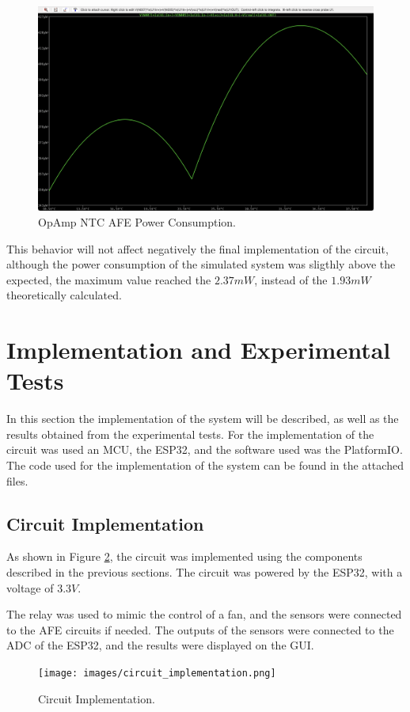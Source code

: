 \documentclass[12pt]{article}
\begin{document}
    \begin{figure}[H] 
        \centering
        \includegraphics*[scale = 0.3]{images/PowerAmpop.png}
        \caption{OpAmp NTC AFE Power Consumption.}
        \label{wrap-fig:1}
    \end{figure}

    This behavior will not affect negatively the final implementation of the circuit, although the power consumption of the simulated system was sligthly above the expected, 
    the maximum value reached the $2.37mW$, instead of the $1.93mW$ theoretically calculated.
    
\section{Implementation and Experimental Tests}

In this section the implementation of the system will be described, as well as the results obtained from the experimental tests. For the implementation of the circuit was used an MCU, the ESP32, and the software used was the PlatformIO. The code used for the implementation of the system can be found in the attached files.

\subsection{Circuit Implementation}
As shown in  Figure \ref{fig:circuit-implementation}, the circuit was implemented using the components described in the previous sections. The circuit was powered by the ESP32, with a voltage of $3.3V$. 

The relay was used to mimic the control of a fan, and the sensors were connected to the AFE circuits if needed. The outputs of the sensors were connected to the ADC of the ESP32, and the results were displayed on the GUI.
\begin{figure}[H] 
    \centering
    \texttt{[image: images/circuit\_implementation.png]}
    \caption{Circuit Implementation.}
    \label{fig:circuit-implementation}
\end{figure}
\end{document}
